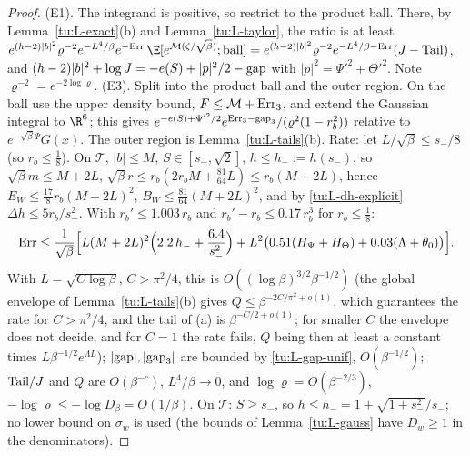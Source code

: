 \begin{proof}
(E1). The integrand is positive, so restrict to the product ball. There, by Lemma~\ref{tu:L-exact}(b) and
Lemma~\ref{tu:L-taylor}, the ratio is at least
$e^{(h-2)|b|^2}\varrho^{-2}e^{-L^4/\beta}e^{-{\rm Err}}\,\E[e^{\mathcal M(\zeta/\sqrt\beta)};\text{ball}]
=e^{(h-2)|b|^2}\varrho^{-2}e^{-L^4/\beta-{\rm Err}}(J-{\rm Tail})$, and
$(h-2)|b|^2+\log J=-e(S)+|p|^2/2-{\rm gap}$ with $|p|^2=\Psi'^2+\Theta'^2$. Note $\varrho^{-2}=e^{-2\log\varrho}$.
(E3). Split into the product ball and the outer region. On the ball use the upper density bound, $F\le\mathcal M+{\rm Err}_3$,
and extend the Gaussian integral to $\R^6$; this gives $e^{-e(S)+\Psi'^2/2}e^{{\rm Err}_3-{\rm gap}_3}/(\varrho^2(1-r_b^2))$
relative to $e^{-\sqrt\beta\Psi}G(x)$. The outer region is Lemma~\ref{tu:L-tails}(b).
Rate: let $L/\sqrt\beta\le s_-/8$ (so $r_b\le\frac18$). On $\mathcal T$, $|b|\le M$, $S\in[s_-,\sqrt2]$, $h\le h_-:=h(s_-)$, so
$\sqrt\beta m\le M+2L$, $\sqrt\beta r\le r_b(2r_bM+\frac{81}{64}L)\le r_b(M+2L)$, hence $E_W\le\frac{17}8r_b(M+2L)^2$,
$B_W\le\frac{81}{64}(M+2L)^2$, and by \eqref{tu:L-dh-explicit} $\Delta h\le5r_b/s_-^2$. With $r_b'\le1.003\,r_b$ and
$r_b'-r_b\le0.17\,r_b^3$ for $r_b\le\frac18$:
\begin{equation}\label{tu:L-err-explicit}
{\rm Err}\le\frac1{\sqrt\beta}\Big[L(M+2L)^2\Big(2.2\,h_-+\frac{6.4}{s_-^2}\Big)+L^2\big(0.51(H_\Psi+H_\Theta)+0.03(\Lambda+\theta_0)\big)\Big].
\end{equation}
With $L=\sqrt{C\log\beta}$, $C>\pi^2/4$, this is $O((\log\beta)^{3/2}\beta^{-1/2})$ (the global envelope of Lemma~\ref{tu:L-tails}(b) gives $Q\le\beta^{-2C/\pi^2+o(1)}$, which guarantees the rate for $C>\pi^2/4$, and the tail of (a) is $\beta^{-C/2+o(1)}$; for smaller $C$ the envelope does not decide, and for $C=1$ the rate fails, $Q$ being then at least a constant times $L\beta^{-1/2}e^{\Lambda L}$); $|{\rm gap}|,|{\rm gap}_3|$ are bounded by
\eqref{tu:L-gap-unif}, $O(\beta^{-1/2})$; ${\rm Tail}/J$ and $Q$ are $O(\beta^{-c})$, $L^4/\beta\to0$, and
$\log\varrho=O(\beta^{-2/3})$, $-\log\varrho\le-\log D_\beta=O(1/\beta)$. On $\mathcal T$: $S\ge s_-$, so
$h\le h_-=1+\sqrt{1+s_-^2}/s_-$; no lower bound on $\sigma_w$ is used (the bounds of Lemma~\ref{tu:L-gauss} have $D_w\ge1$
in the denominators).
\end{proof}

